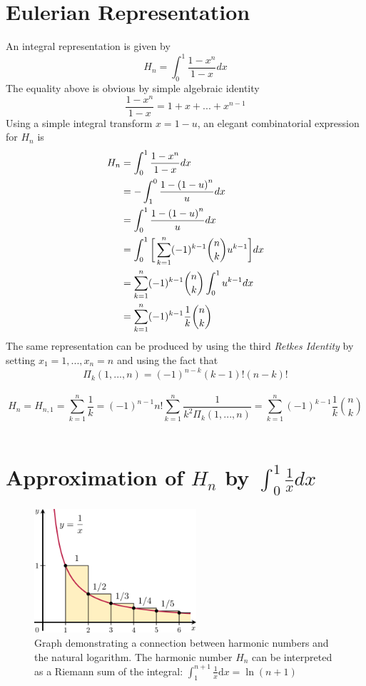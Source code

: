 \documentclass[2pt]{article}
\begin{document}
\section{Eulerian Representation}
An integral representation is given by
\begin{equation}
H_{n} = \int_{0}^{1} \frac{1-x^n}{1-x} dx \label{Euler equation}\nonumber
\end{equation}
The equality above is obvious by simple algebraic identity
\begin{equation}
\frac{1-x^n}{1-x} = 1+x+...+x^{n-1}\nonumber
\end{equation}
Using a simple integral transform ${x = 1-u}$, an elegant combinatorial expression for $H_{n}$ is\\
\begin{align}
H_{n} &= \int_{0}^{1} \frac{1-x^n}{1-x} dx\nonumber \\
	 &= -\int_{1}^{0} \frac{1-{(1-u)}^n}{u} dx \nonumber \\
	 &= \int_{0}^{1} \frac{1-{(1-u)}^n}{u} dx \nonumber \\
	 &= \int_{0}^{1} \bigg{[}\sum_{k=1}^{n} (-1)^{k-1} {n \choose k} u^{k-1}\bigg{]}dx \nonumber \\
	 &= \sum_{k=1}^{n} (-1)^{k-1} {n \choose k} \int_{0}^{1} u^{k-1} \nonumber dx\\
	 &= \sum_{k=1}^{n} (-1)^{k-1} \frac{1}{k} {n \choose k} \nonumber
\end{align}
The same representation can be produced by using the third \emph{Retkes Identity} by setting $x_{1} = 1, . . . , x_{n} = n$ and using the fact that
\begin{equation}
{\Pi}_{k}(1, . . . , n) = {(-1)}^{n-k} (k-1)!(n-k)! \nonumber
\end{equation}
\\
\begin{equation}
H_{n}=H_{n,1}=\sum_{k=1}^{n} \frac{1}{k} = {(-1)}^{n-1}n!\sum_{k=1}^{n}\frac{1}{k^{2}{\Pi}_{k}(1, . . . ,n)}=\sum_{k=1}^{n}{(-1)}^{k-1}\frac{1}{k}{n \choose k} \nonumber
\end{equation}
\\
\section{Approximation of $H_{n}$ by $\int_{0}^{1}\frac{1}{x} dx$}
\begin{figure}
\includegraphics[width=6cm]{2.png}
\caption{\small{Graph demonstrating a connection between harmonic numbers and the natural logarithm. The harmonic number $H_{n}$ can be interpreted as a Riemann sum of the integral: $\int_1^{n+1} \frac{1}{x} \mathrm{d}x = \ln(n+1)$}}
\end{figure}
\end{document}
